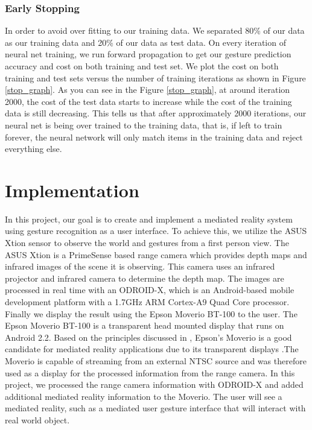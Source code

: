 \documentclass[conference]{IEEEtran}
\begin{document}
\subsubsection{Early Stopping}
In order to avoid over fitting to our training data. We separated 80\% of our data as our training data and 20\% of our data as test data. On every iteration of neural net training, we run  forward propagation to get our gesture prediction accuracy and cost on both training and test set. We plot the cost on both training and test sets versus the number of training iterations as shown in Figure \ref{stop_graph}. As you can see in the Figure \ref{stop_graph}, at around iteration 2000, the cost of the test data starts to increase while the cost of the training data is still decreasing. This tells us that after approximately 2000 iterations, our neural net is being over trained to the training data, that is, if left to train forever, the neural network will only match items in the training data and reject everything else.

\section{Implementation}
In this project, our goal is to create and implement a mediated reality system using gesture recognition as a user interface. To achieve this, we utilize the ASUS Xtion sensor to observe the world and gestures from a first person view. The ASUS Xtion is a PrimeSense based range camera which provides depth maps and infrared images of the scene it is observing. This camera uses an infrared projector and infrared camera to determine the depth map. The images are processed in real time with an ODROID-X, which is an Android-based mobile development platform with a 1.7GHz ARM Cortex-A9 Quad Core processor. Finally we display the result using the Epson Moverio BT-100 to the user. 
The Epson Moverio BT-100 is a transparent head mounted display that runs on Android 2.2. Based on the principles discussed in \cite{mann2001wearable}, Epson's Moverio is a good candidate for mediated reality applications due to its transparent displays .The Moverio is capable of streaming from an external NTSC source and was therefore used as a display for the processed information from the range camera. In this project, we processed the range camera information with ODROID-X and added additional mediated reality information to the Moverio. The user will see a mediated reality, such as a mediated user gesture interface that will interact with real world object.
\end{document}
